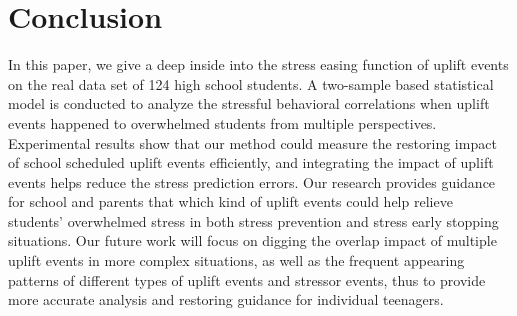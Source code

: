 \section{Conclusion}
\label{sec:conclude}
In this paper, 
we give a deep inside into the stress easing function of uplift events on the real data set of 124 high school students.
A two-sample based statistical model is conducted to analyze the stressful behavioral correlations
when uplift events happened to overwhelmed students from multiple perspectives.
Experimental results show that our method could measure the restoring impact of school scheduled uplift events efficiently, and integrating the impact of uplift events helps reduce the stress prediction errors.
Our research provides guidance for school and parents that
which kind of uplift events could help relieve students' overwhelmed stress
in both stress prevention and stress early stopping situations.
Our future work will focus on digging the overlap impact of multiple uplift events in more complex situations, as well as the frequent appearing patterns of different types of uplift events and stressor events,
thus to provide more accurate analysis and restoring guidance for individual teenagers.